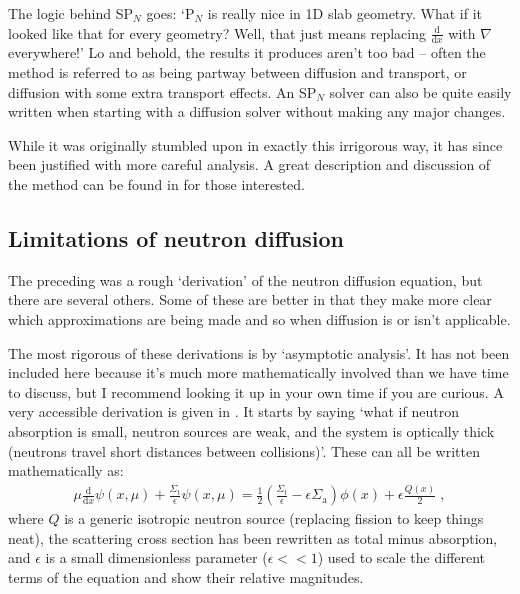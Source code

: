 \documentclass{article}
\begin{document}
The logic behind SP$_N$ goes: `P$_N$ is really nice in 1D slab geometry. What if it looked like that for every geometry? Well, that just means replacing $\frac{\mathrm{d}}{\mathrm{d}x}$ with $\nabla$ everywhere!' Lo and behold, the results it produces aren't too bad -- often the method is referred to as being partway between diffusion and transport, or diffusion with some extra transport effects. An SP$_N$ solver can also be quite easily written when starting with a diffusion solver without making any major changes. 

While it was originally stumbled upon in exactly this irrigorous way, it has since been justified with more careful analysis. A great description and discussion of the method can be found in \cite{McClarren} for those interested.

\subsection{Limitations of neutron diffusion}

The preceding was a rough `derivation' of the neutron diffusion equation, but there are several others. Some of these are better in that they make more clear which approximations are being made and so when diffusion is or isn't applicable.

The most rigorous of these derivations is by `asymptotic analysis'. It has not been included here because it's much more mathematically involved than we have time to discuss, but I recommend looking it up in your own time if you are curious. A very accessible derivation is given in \cite{Adams}. It starts by saying `what if neutron absorption is small, neutron sources are weak, and the system is optically thick (neutrons travel short distances between collisions)'. These can all be written mathematically as:
\begin{equation}\label{eq:transport_asymp}
    \begin{split}
 \mu\frac{\mathrm{d}}{\mathrm{d}x}\psi(x,\mu) + \frac{\Sigma_\mathrm{t}}{\epsilon}\psi(x,\mu)
    =\frac{1}{2} \left(\frac{\Sigma_\mathrm{t}}{\epsilon}-\epsilon\Sigma_\mathrm{a}\right)\phi(x)+\epsilon \frac{Q(x)}{2}\;\mathrm{,}
    \end{split}
\end{equation}
where $Q$ is a generic isotropic neutron source (replacing fission to keep things neat), the scattering cross section has been rewritten as total minus absorption, and $\epsilon$ is a small dimensionless parameter ($\epsilon <<1$) used to scale the different terms of the equation and show their relative magnitudes.
\end{document}
